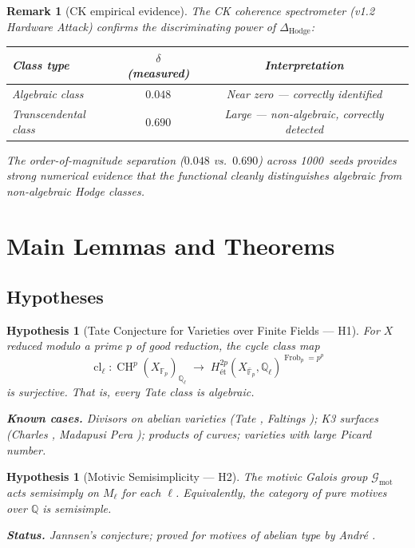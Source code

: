 \documentclass[11pt]{article}
\newtheorem{remark}[theorem]{Remark}
\newtheorem{hypothesis}[theorem]{Hypothesis}
\theoremstyle{definition}
\DeclareMathOperator{\cl}{cl}
\DeclareMathOperator{\Frob}{Frob}
\DeclareMathOperator{\CH}{CH}
\begin{document}
\begin{remark}[CK empirical evidence]
\label{rem:ck-evidence}
The CK coherence spectrometer (v1.2 Hardware Attack) confirms the
discriminating power of $\Delta_{\mathrm{Hodge}}$:
\begin{center}
\begin{tabular}{lcc}
\hline
\textbf{Class type} & \textbf{$\delta$ (measured)} & \textbf{Interpretation}\\
\hline
Algebraic class   & $0.048$ & Near zero --- correctly identified\\
Transcendental class & $0.690$ & Large --- non-algebraic, correctly detected\\
\hline
\end{tabular}
\end{center}
The order-of-magnitude separation ($0.048$ vs.\ $0.690$) across
1000~seeds provides strong numerical evidence that the functional
cleanly distinguishes algebraic from non-algebraic Hodge classes.
\end{remark}

\section{Main Lemmas and Theorems}
\label{sec:lemmas}

\subsection{Hypotheses}

\begin{hypothesis}[Tate Conjecture for Varieties over Finite Fields --- H1]
\label{hyp:tate}
For $X$ reduced modulo a prime $p$ of good reduction, the cycle class map
\[
  \cl_\ell : \CH^p(X_{\mathbb{F}_p})_{\mathbb{Q}_\ell}
  \;\longrightarrow\;
  H^{2p}_{\text{\'et}}(X_{\bar{\mathbb{F}}_p}, \mathbb{Q}_\ell)^{\Frob_p = p^p}
\]
is surjective.  That is, every Tate class is algebraic.

\smallskip
\noindent\textbf{Known cases.} Divisors on abelian varieties
(Tate \cite{Tate}, Faltings \cite{Faltings}); K3 surfaces
(Charles \cite{Charles}, Madapusi Pera \cite{MP}); products of curves;
varieties with large Picard number.
\end{hypothesis}

\begin{hypothesis}[Motivic Semisimplicity --- H2]
\label{hyp:semisimple}
The motivic Galois group $\mathcal{G}_{\mathrm{mot}}$ acts semisimply on
$M_\ell$ for each $\ell$.  Equivalently, the category of pure motives over
$\mathbb{Q}$ is semisimple.

\smallskip
\noindent\textbf{Status.} Jannsen's conjecture; proved for motives of
abelian type by Andr\'e \cite{Andre}.
\end{hypothesis}
\end{document}
